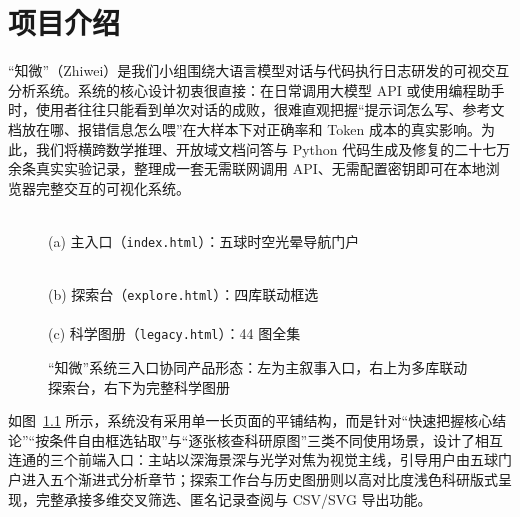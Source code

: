 \chapter{项目介绍}\label{part:project}

“知微”（Zhiwei）是我们小组围绕大语言模型对话与代码执行日志研发的可视交互分析系统。系统的核心设计初衷很直接：在日常调用大模型 API 或使用编程助手时，使用者往往只能看到单次对话的成败，很难直观把握“提示词怎么写、参考文档放在哪、报错信息怎么喂”在大样本下对正确率和 Token 成本的真实影响。为此，我们将横跨数学推理、开放域文档问答与 Python 代码生成及修复的二十七万余条真实实验记录，整理成一套无需联网调用 API、无需配置密钥即可在本地浏览器完整交互的可视化系统。

\begin{figure}[!htbp]
\centering
\begin{minipage}[c]{0.605\linewidth}
  \centering
  \\[4pt]
  {\fontsize{9.5bp}{12bp}\selectfont (a) 主入口（\texttt{index.html}）：五球时空光晕导航门户}
\end{minipage}\hfill
\begin{minipage}[c]{0.375\linewidth}
  \centering
  \\[2.5pt]
  {\fontsize{9bp}{11.5bp}\selectfont (b) 探索台（\texttt{explore.html}）：四库联动框选}\\[5pt]
  \\[2.5pt]
  {\fontsize{9bp}{11.5bp}\selectfont (c) 科学图册（\texttt{legacy.html}）：44 图全集}
\end{minipage}
\caption{“知微”系统三入口协同产品形态：左为主叙事入口，右上为多库联动探索台，右下为完整科学图册}
\label{fig:ui-overview}
\end{figure}

如图~\ref{fig:ui-overview} 所示，系统没有采用单一长页面的平铺结构，而是针对“快速把握核心结论”“按条件自由框选钻取”与“逐张核查科研原图”三类不同使用场景，设计了相互连通的三个前端入口：主站以深海景深与光学对焦为视觉主线，引导用户由五球门户进入五个渐进式分析章节；探索工作台与历史图册则以高对比度浅色科研版式呈现，完整承接多维交叉筛选、匿名记录查阅与 CSV/SVG 导出功能。




